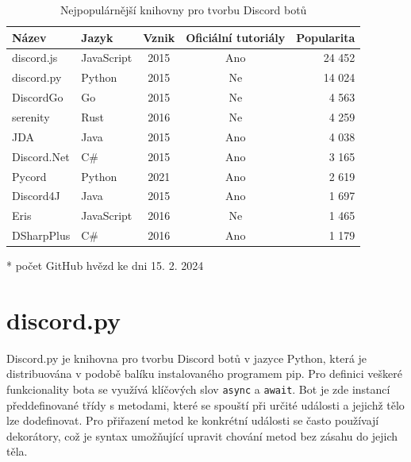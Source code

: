\documentclass[FM]{tulthesis}
\begin{document}
	\begin{table}[ht]
		\centering
		\caption{Nejpopulárnější knihovny pro tvorbu Discord botů}\medskip
		\begin{threeparttable}
			\begin{tabular}{ l l c c r }
				\textbf{Název} & \textbf{Jazyk} & \textbf{Vznik} & \textbf{Oficiální tutoriály} & \textbf{Popularita}\tnote{*} \\\hline
				discord.js	& JavaScript & 2015 & Ano & 24 452 \\
				discord.py	& Python	 & 2015 & Ne  & 14 024 \\
				DiscordGo	& Go		 & 2015 & Ne  &  4 563 \\
				serenity	& Rust		 & 2016 & Ne  &  4 259 \\
				JDA			& Java		 & 2015 & Ano &  4 038 \\
				Discord.Net & C\#		 & 2015 & Ano &  3 165 \\
				Pycord		& Python	 & 2021 & Ano &  2 619 \\
				Discord4J	& Java		 & 2015 & Ano &  1 697 \\
				Eris		& JavaScript & 2016 & Ne  &  1 465 \\
				DSharpPlus	& C\#		 & 2016 & Ano &  1 179 \\
			\hline\end{tabular}
			\begin{tablenotes}
				\item[*] počet GitHub hvězd ke dni 15. 2. 2024
			\end{tablenotes}
		\end{threeparttable}
	\end{table}
	
	\section{discord.py}\label{_tag_section_discordpy}
	
	Discord.py je knihovna pro tvorbu Discord botů v jazyce Python, která je distribuována v podobě balíku instalovaného programem pip. Pro definici veškeré funkcionality bota se využívá klíčových slov \verb|async| a \verb|await|. Bot je zde instancí předdefinované třídy s metodami, které se spouští při určité události a jejichž tělo lze dodefinovat. Pro přiřazení metod ke konkrétní události se často používají dekorátory, což je syntax umožňující upravit chování metod bez zásahu do jejich těla.%
	
\end{document}
